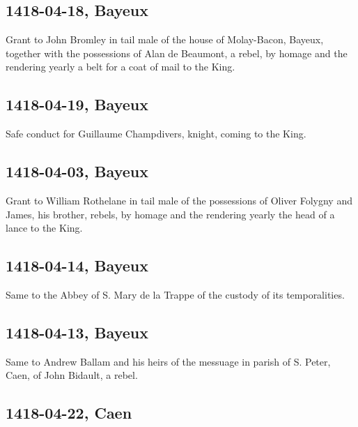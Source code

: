 \documentclass[a4paper,12pt,twoside]{book}
\begin{document}
            \subsection{1418-04-18, Bayeux}
            
                     Grant to John Bromley in tail male of the house of Molay-Bacon, Bayeux, together with the possessions of Alan de Beaumont, a rebel, by homage and the rendering yearly a belt for a coat of mail to the King.
                  
            \subsection{1418-04-19, Bayeux}
            
                     Safe conduct for Guillaume Champdivers, knight, coming to the King.
                  
            \subsection{1418-04-03, Bayeux}
            
                     Grant to William Rothelane in tail male of the possessions of Oliver Folygny and James, his brother, rebels, by homage and the rendering yearly the head of a lance to the King.
                  
            \subsection{1418-04-14, Bayeux}
            
                     Same to the Abbey of S. Mary de la Trappe of the custody of its temporalities.
                  
            \subsection{1418-04-13, Bayeux}
            
                     Same to Andrew Ballam and his heirs of the messuage in parish of S. Peter, Caen, of John Bidault, a rebel.
                  
            \subsection{1418-04-22, Caen}
            
\end{document}
